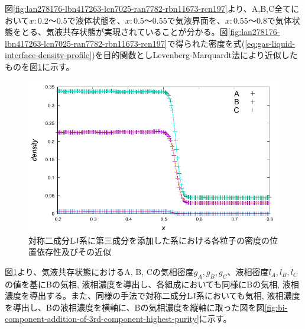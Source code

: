 \documentclass[titlepage]{jsreport}
\begin{document}
\newpage
図\ref{fig:lan278176-lbn417263-lcn7025-ran7782-rbn11673-rcn197}より、A,B,C全てにおいて$x:0.2〜0.5$で液体状態を、$x:0.5〜0.55$で気液界面を、$x:0.55〜0.8$で気体状態をとる、気液共存状態が実現されていることが分かる。図\ref{fig:lan278176-lbn417263-lcn7025-ran7782-rbn11673-rcn197}で得られた密度を式(\ref{eq:gas-liquid-interface-density-profile})を目的関数としLevenberg-Marquardt法により近似したものを図\ref{fig:lan278176-lbn417263-lcn7025-ran7782-rbn11673-rcn197-fitting}に示す。

\begin{figure}[htbp]
    \begin{center}
        \includegraphics[width=14cm]{fig/lan278176-lbn417263-lcn7025-ran7782-rbn11673-rcn197/lan278176-lbn417263-lcn7025-ran7782-rbn11673-rcn197-fitting.pdf}
    \end{center}
    \caption{対称二成分LJ系に第三成分を添加した系における各粒子の密度の位置依存性及びその近似}
    \label{fig:lan278176-lbn417263-lcn7025-ran7782-rbn11673-rcn197-fitting}
\end{figure}

\newpage

図\ref{fig:lan278176-lbn417263-lcn7025-ran7782-rbn11673-rcn197-fitting}より、気液共存状態におけるA, B, Cの気相密度$g_A, g_B, g_C$、液相密度$l_A, l_B, l_C$の値を基にBの気相, 液相濃度を導出し、各組成においても同様にBの気相, 液相濃度を導出する。また、同様の手法で対称二成分LJ系においても気相, 液相濃度を導出し、Bの液相濃度を横軸に、Bの気相濃度を縦軸に取った図を図\ref{fig:bi-component-addition-of-3rd-component-highest-purity}に示す。
\end{document}
